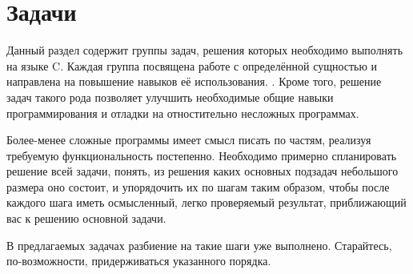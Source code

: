 \chapter{Задачи}

Данный раздел содержит группы задач, решения которых необходимо выполнять на
языке C. Каждая группа посвящена работе с определённой сущностью и направлена
на повышение навыков её использования. .
Кроме того, решение задач такого рода позволяет улучшить необходимые общие навыки 
программирования и отладки на отностительно несложных программах.

Более-менее сложные программы имеет смысл писать по частям, реализуя требуемую
функциональность постепенно. Необходимо примерно спланировать решение всей
задачи, понять, из решения каких основных подзадач небольшого размера оно
состоит, и упорядочить их по шагам таким образом, чтобы после каждого шага
иметь осмысленный, легко проверяемый результат, приближающий вас к решению
основной задачи.

В предлагаемых задачах разбиение на такие шаги уже выполнено. Старайтесь,
по-возможности, придерживаться указанного порядка.




















\endinput

\chapter{На доработку}

